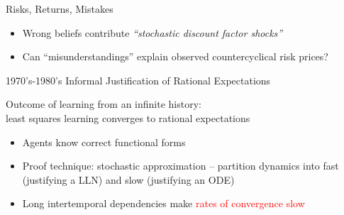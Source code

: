\documentclass{beamer}
\theoremstyle{Definition}
\begin{document}
\begin{frame}{Risks,  Returns, Mistakes}


\begin{itemize}
\item Wrong beliefs contribute {\em ``stochastic discount factor shocks''} 
\item Can ``misunderstandings'' explain observed countercyclical risk prices?
\end{itemize}

\end{frame}

%
%
%
%
%
%
%
%
%


\begin{frame}{1970's-1980's Informal Justification of Rational Expectations}


Outcome of learning from an infinite history:\\
least squares learning converges to rational expectations

 \begin{itemize}
    \item Agents know  correct functional forms
  \item Proof technique: stochastic approximation --  partition  dynamics into fast  (justifying a  LLN) and slow (justifying an ODE)
  \item Long intertemporal dependencies make  {\textcolor{red}{rates of convergence  slow}}
 \end{itemize}

\end{frame}
\end{document}
